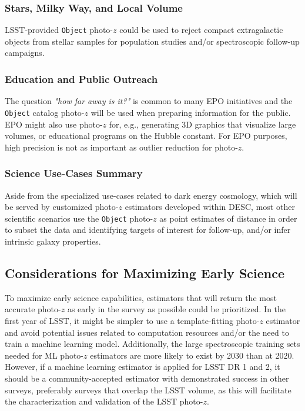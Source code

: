\documentclass[DM,lsstdraft,toc]{lsstdoc}
\begin{document}
\subsubsection{Stars, Milky Way, and Local Volume}\label{sssec:use_sci_smwlv}
LSST-provided {\tt Object} photo-$z$ could be used to reject compact extragalactic objects from stellar samples for population studies and/or spectroscopic follow-up campaigns.

\subsubsection{Education and Public Outreach}\label{sssec:use_sci_epo}
The question {\it "how far away is it?"} is common to many EPO initiatives and the {\tt Object} catalog photo-$z$ will be used when preparing information for the public.
EPO might also use photo-$z$ for, e.g., generating 3D graphics that visualize large volumes, or educational programs on the Hubble constant.
For EPO purposes, high precision is not as important as outlier reduction for photo-$z$.


\subsubsection{Science Use-Cases Summary}\label{sssec:use_sci_sum}
Aside from the specialized use-cases related to dark energy cosmology, which will be served by customized photo-$z$ estimators developed within DESC, most other scientific scenarios use the {\tt Object} photo-$z$ as point estimates of distance in order to subset the data and identifying targets of interest for follow-up, and/or infer intrinsic galaxy properties.

\subsection{Considerations for Maximizing Early Science}\label{ssec:use_LOY1}

To maximize early science capabilities, estimators that will return the most accurate photo-$z$ as early in the survey as possible could be prioritized.
In the first year of LSST, it might be simpler to use a template-fitting photo-$z$ estimator and avoid potential issues related to computation resources and/or the need to train a machine learning model.
Additionally, the large spectroscopic training sets needed for ML photo-$z$ estimators are more likely to exist by 2030 than at 2020.
However, if a machine learning estimator is applied for LSST DR 1 and 2, it should be a community-accepted estimator with demonstrated success in other surveys, preferably surveys that overlap the LSST volume, as this will facilitate the characterization and validation of the LSST photo-$z$.
\end{document}

